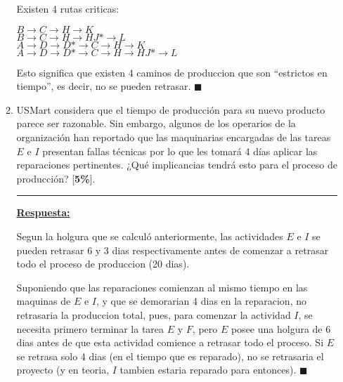 \documentclass[legalpaper,10pt]{article}
\begin{document}
\begin{enumerate}
\begin{enumerate}
  Existen 4 rutas criticas:\\
  \begin{center}
    $B \rightarrow C \rightarrow H \rightarrow K$ \\
    $B \rightarrow C \rightarrow H \rightarrow HJ* \rightarrow L$\\
    $A \rightarrow D \rightarrow D* \rightarrow C \rightarrow H \rightarrow K$\\
    $A \rightarrow D \rightarrow D* \rightarrow C \rightarrow H \rightarrow HJ* \rightarrow L$
  \end{center}

  Esto significa que existen 4 caminos de produccion que son ``estrictos en tiempo'', es decir, no se pueden retrasar. \hfill \(\blacksquare\)


  \vspace{3em}



  \item USMart considera que el tiempo de producción para su nuevo producto parece ser razonable. Sin embargo, algunos de los operarios de la organización han reportado que las maquinarias encargadas de las tareas $E$ e $I$ presentan fallas técnicas por lo que les tomará 4 días aplicar las reparaciones pertinentes. ¿Qué implicancias tendrá esto para el proceso de producción? [\textbf{5\%}].


  \rule{5cm}{0.4pt}

  \underline{\textbf{Respuesta:}}

  Segun la holgura que se calculó anteriormente, las actividades $E$ e $I$ se pueden retrasar 6 y 3 dias respectivamente antes de comenzar a retrasar todo el proceso de produccion (20 dias).

  Suponiendo que las reparaciones comienzan al mismo tiempo en las maquinas de $E$ e $I$, y que se demorarian 4 dias en la reparacion, no retrasaria la produccion total, pues, para comenzar la actividad $I$, se necesita primero terminar la tarea $E$ y $F$, pero $E$ posee una holgura de 6 dias antes de que esta actividad comience a retrasar todo el proceso. Si $E$ se retrasa solo 4 dias (en el tiempo que es reparado), no se retrasaria el proyecto (y en teoria, $I$ tambien estaria reparado para entonces). \hfill \(\blacksquare\)



\end{enumerate}


\newpage


\end{enumerate}
\end{document}
